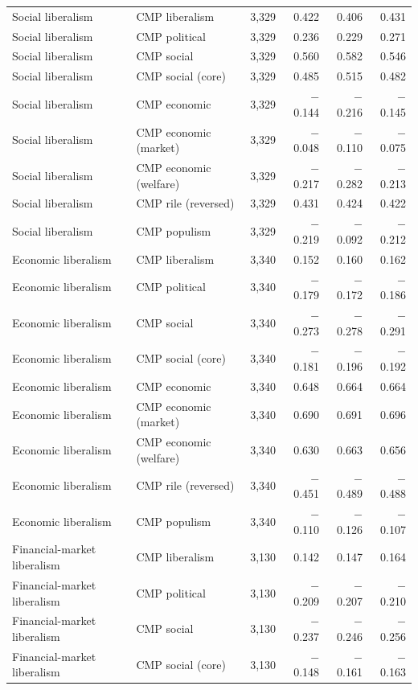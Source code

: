 \begin{table}[ht]
{\begin{tabular}{llrrrr}
Social liberalism & CMP liberalism & 3,329 & 0.422 & 0.406 & 0.431 \\
Social liberalism & CMP political & 3,329 & 0.236 & 0.229 & 0.271 \\
Social liberalism & CMP social & 3,329 & 0.560 & 0.582 & 0.546 \\
Social liberalism & CMP social (core) & 3,329 & 0.485 & 0.515 & 0.482 \\
Social liberalism & CMP economic & 3,329 & $-$0.144 & $-$0.216 & $-$0.145 \\
Social liberalism & CMP economic (market) & 3,329 & $-$0.048 & $-$0.110 & $-$0.075 \\
Social liberalism & CMP economic (welfare) & 3,329 & $-$0.217 & $-$0.282 & $-$0.213 \\
Social liberalism & CMP rile (reversed) & 3,329 & 0.431 & 0.424 & 0.422 \\
Social liberalism & CMP populism & 3,329 & $-$0.219 & $-$0.092 & $-$0.212 \\
Economic liberalism & CMP liberalism & 3,340 & 0.152 & 0.160 & 0.162 \\
Economic liberalism & CMP political & 3,340 & $-$0.179 & $-$0.172 & $-$0.186 \\
Economic liberalism & CMP social & 3,340 & $-$0.273 & $-$0.278 & $-$0.291 \\
Economic liberalism & CMP social (core) & 3,340 & $-$0.181 & $-$0.196 & $-$0.192 \\
Economic liberalism & CMP economic & 3,340 & 0.648 & 0.664 & 0.664 \\
Economic liberalism & CMP economic (market) & 3,340 & 0.690 & 0.691 & 0.696 \\
Economic liberalism & CMP economic (welfare) & 3,340 & 0.630 & 0.663 & 0.656 \\
Economic liberalism & CMP rile (reversed) & 3,340 & $-$0.451 & $-$0.489 & $-$0.488 \\
Economic liberalism & CMP populism & 3,340 & $-$0.110 & $-$0.126 & $-$0.107 \\
Financial-market liberalism & CMP liberalism & 3,130 & 0.142 & 0.147 & 0.164 \\
Financial-market liberalism & CMP political & 3,130 & $-$0.209 & $-$0.207 & $-$0.210 \\
Financial-market liberalism & CMP social & 3,130 & $-$0.237 & $-$0.246 & $-$0.256 \\
Financial-market liberalism & CMP social (core) & 3,130 & $-$0.148 & $-$0.161 & $-$0.163 \\

\end{tabular}}
\end{table}
